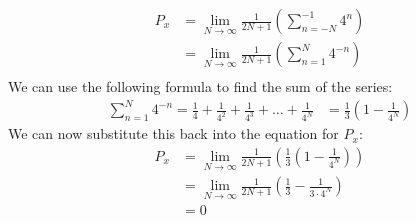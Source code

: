 \documentclass{article}
\begin{document}
\begin{enumerate}[label=\alph*.]
    \begin{align*}
        P_x &= \lim_{N \to \infty} \frac{1}{2N + 1} \left(\sum_{n=-N}^{-1} 4^n\right) \\
        &= \lim_{N \to \infty} \frac{1}{2N + 1} \left(\sum_{n=1}^{N} 4^{-n}\right) \\
    \end{align*}
    We can use the following formula to find the sum of the series:
    \begin{align*}
        \sum_{n=1}^{N} 4^{-n} = \frac{1}{4} + \frac{1}{4^2} + \frac{1}{4^3} + \ldots + \frac{1}{4^N} &= \frac{1}{3}\left(1 - \frac{1}{4^N}\right)
    \end{align*}
    We can now substitute this back into the equation for $P_x$:
    \begin{align*}
        P_x &= \lim_{N \to \infty} \frac{1}{2N + 1} \left(\frac{1}{3}\left(1 - \frac{1}{4^N}\right)\right) \\
        &= \lim_{N \to \infty} \frac{1}{2N + 1} \left(\frac{1}{3} - \frac{1}{3 \cdot 4^N}\right) \\
        &= 0
    \end{align*}

\end{enumerate}
\end{document}
